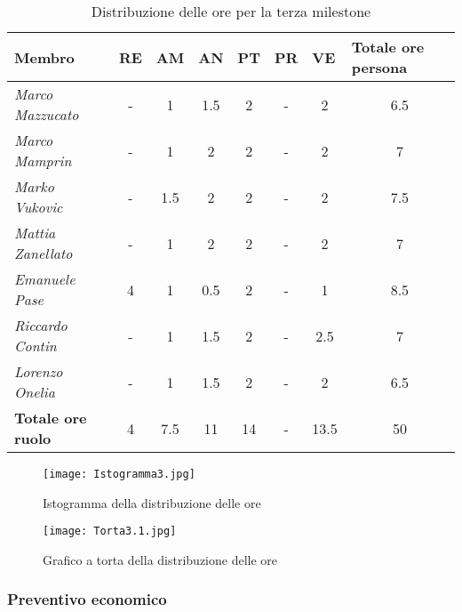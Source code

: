 \begin{table}[H]
    \centering
    \begin{tabular}{|l|c|c|c|c|c|c|c|}
    \hline
    \textbf{Membro} & \multicolumn{1}{l|}{\textbf{RE}} & \multicolumn{1}{l|}{\textbf{AM}} & \multicolumn{1}{l|}{\textbf{AN}} & \multicolumn{1}{l|}{\textbf{PT}} & \multicolumn{1}{l|}{\textbf{PR}} & \multicolumn{1}{l|}{\textbf{VE}} & \multicolumn{1}{l|}{\textbf{Totale ore persona}} \\ \hline
    \textit{Marco Mazzucato}  & - & 1   & 1.5 & 2 & -  & 2    & 6.5  \\ \hline
    \textit{Marco Mamprin}    & - & 1   & 2   & 2 & -  & 2    & 7    \\ \hline
    \textit{Marko Vukovic}    & - & 1.5 & 2   & 2 & -  & 2    & 7.5  \\ \hline
    \textit{Mattia Zanellato} & - & 1   & 2   & 2 & -  & 2    & 7    \\ \hline
    \textit{Emanuele Pase}    & 4 & 1   & 0.5 & 2 & -  & 1    & 8.5  \\ \hline
    \textit{Riccardo Contin}  & - & 1   & 1.5 & 2 & -  & 2.5  & 7    \\ \hline
    \textit{Lorenzo Onelia}   & - & 1   & 1.5 & 2 & -  & 2    & 6.5  \\ \hline
    \textbf{Totale ore ruolo} & 4 & 7.5 & 11  & 14& - & 13.5 & 50   \\ \hline
    \end{tabular}
    \caption{Distribuzione delle ore per la terza milestone}
\end{table}

\begin{figure}[H]
    \texttt{[image: Istogramma3.jpg]}
    \caption{Istogramma della distribuzione delle ore}
\end{figure}

\begin{figure}[H]
    \texttt{[image: Torta3.1.jpg]}
    \caption{Grafico a torta della distribuzione delle ore}
\end{figure}

\newpage
\subsubsection{Preventivo economico}

